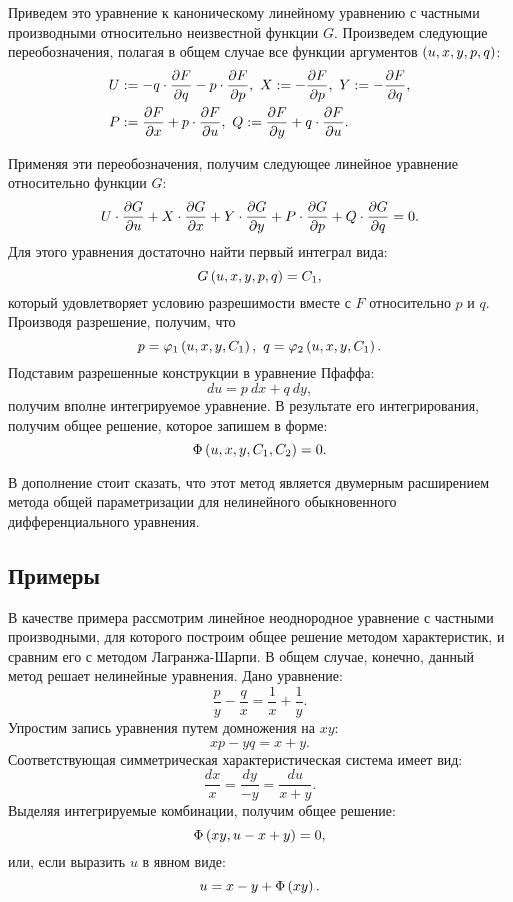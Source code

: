 	Приведем это уравнение к каноническому линейному уравнению с частными производными относительно неизвестной функции $G$. Произведем следующие переобозначения, полагая в общем случае все функции аргументов $\left( u, x, y, p, q \right)$:
	\[ \begin{split}
		U &:= -q \cdot \dfrac{\partial F}{\partial q} - p \cdot \dfrac{\partial F}{\partial p}, ~ X := -\dfrac{\partial F}{\partial p}, ~ Y := -\dfrac{\partial F}{\partial q}, \\ 
		P &:= \dfrac{\partial F}{\partial x} + p \cdot \dfrac{\partial F}{\partial u}, ~ Q := \dfrac{\partial F}{\partial y} + q \cdot \dfrac{\partial F}{\partial u}.
	\end{split} \]

	Применяя эти переобозначения, получим следующее линейное уравнение относительно функции $G$:
	\[ U \cdot \dfrac{\partial G}{\partial u} + X \cdot \dfrac{\partial G}{\partial x} + Y \cdot \dfrac{\partial G}{\partial y} + P \cdot \dfrac{\partial G}{\partial p} + Q \cdot \dfrac{\partial G}{\partial q} = 0. \]
	Для этого уравнения достаточно найти первый интеграл вида:
	\[ G \left( u, x, y, p, q \right) = C_1, \]
	который удовлетворяет условию разрешимости вместе с $F$ относительно $p$ и $q$. Производя разрешение, получим, что
	\[ p = \varphi_1 \left( u, x, y, C_1 \right), ~ q = \varphi_2 \left( u, x, y, C_1 \right). \]
	Подставим разрешенные конструкции в уравнение Пфаффа:
	\[ du = p ~ dx + q ~ dy, \]
	получим вполне интегрируемое уравнение. В результате его интегрирования, получим общее решение, которое запишем в форме:
	\[ \Phi \left( u, x, y, C_1, C_2 \right) = 0. \]

	В дополнение стоит сказать, что этот метод является двумерным расширением метода общей параметризации для нелинейного обыкновенного дифференциального уравнения.

	\subsection{Примеры}

		В качестве примера рассмотрим линейное неоднородное уравнение с частными производными, для которого построим общее решение методом характеристик, и сравним его с методом Лагранжа-Шарпи. В общем случае, конечно, данный метод решает нелинейные уравнения. Дано уравнение:
		\[ \frac{p}{y} - \frac{q}{x} = \frac{1}{x} + \frac{1}{y}. \]
		Упростим запись уравнения путем домножения на $xy$:
		\[ xp - yq = x + y. \]
		Соответствующая симметрическая характеристическая система имеет вид:
		\[ \frac{dx}{x} = \frac{dy}{-y} = \frac{du}{x+y}. \]
		Выделяя интегрируемые комбинации, получим общее решение:
		\[ \Phi \left( xy, u - x + y \right) = 0, \]
		или, если выразить $u$ в явном виде:
		\[ u = x - y + \Phi \left( xy \right). \]
		
